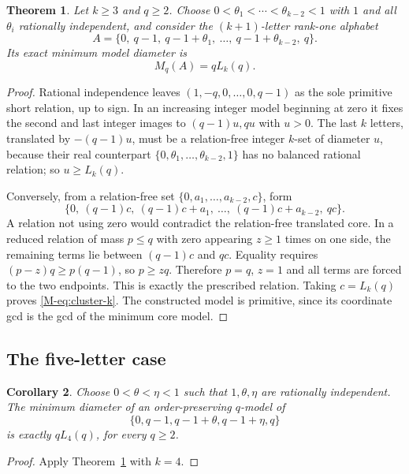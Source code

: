 \documentclass[11pt,reqno]{amsart}
\theoremstyle{plain}
\newtheorem{theorem}{Theorem}[section]
\newtheorem{corollary}[theorem]{Corollary}
\theoremstyle{definition}
\theoremstyle{plain}
\theoremstyle{plain}
\theoremstyle{plain}
\theoremstyle{plain}
\theoremstyle{plain}
\theoremstyle{plain}
\theoremstyle{definition}
\theoremstyle{definition}
\theoremstyle{definition}
\theoremstyle{plain}
\begin{document}
\begin{theorem}\label{M-thm:cluster-k}
Let $k\ge3$ and $q\ge2$. Choose $0<\theta_1<\cdots<\theta_{k-2}<1$ with $1$
and all $\theta_i$ rationally independent, and consider the $(k+1)$-letter
rank-one alphabet
\[
 A=\{0,\ q-1,\ q-1+\theta_1,\ \ldots,\ q-1+\theta_{k-2},\ q\}.
\]
Its exact minimum model diameter is
\begin{equation}\label{M-eq:cluster-k}
 M_q(A)=qL_k(q).
\end{equation}
\end{theorem}
\begin{proof}
Rational independence
leaves $(1,-q,0,\ldots,0,q-1)$ as the sole primitive short relation, up to
sign. In an increasing integer model beginning at zero it fixes the second
and last integer images to $(q-1)u,qu$ with $u>0$. The last $k$ letters,
translated by $-(q-1)u$, must be a relation-free integer $k$-set of diameter
$u$, because their real counterpart $\{0,\theta_1,\ldots,\theta_{k-2},1\}$
has no balanced rational relation; so $u\ge L_k(q)$.

Conversely, from a relation-free set $\{0,a_1,\ldots,a_{k-2},c\}$, form
\[
 \{0,\ (q-1)c,\ (q-1)c+a_1,\ \ldots,\ (q-1)c+a_{k-2},\ qc\}.
\]
A relation not using zero would contradict the relation-free translated
core. In a reduced relation of mass $p\le q$ with zero appearing $z\ge1$
times on one side, the remaining terms lie between $(q-1)c$ and $qc$.
Equality requires $(p-z)q\ge p(q-1)$, so $p\ge zq$. Therefore $p=q$, $z=1$
and all terms are forced to the two endpoints. This is exactly the
prescribed relation. Taking $c=L_k(q)$ proves \eqref{M-eq:cluster-k}. The constructed model
is primitive, since its coordinate gcd is the gcd of the minimum core model.
\end{proof}


\subsection{The five-letter case}
\begin{corollary}\label{M-thmG}\label{M-thm:cluster-model}
Choose $0<\theta<\eta<1$ such that $1,\theta,\eta$ are rationally
independent. The minimum diameter of an order-preserving $q$-model of
\[
 \{0,q-1,q-1+\theta,q-1+\eta,q\}
\]
is exactly $qL_4(q)$, for every $q\ge2$.
\end{corollary}
\begin{proof}
Apply Theorem~\ref{M-thm:cluster-k} with $k=4$.
\end{proof}
\end{document}
